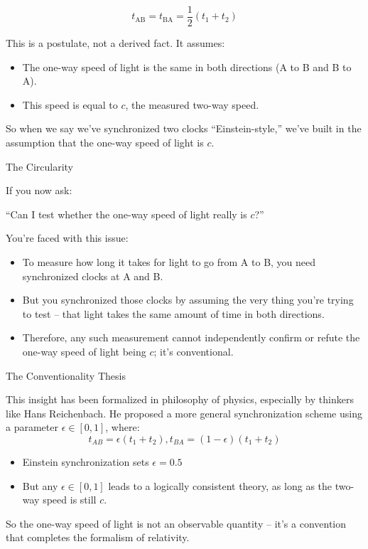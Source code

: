 \documentclass[a4paper]{article}
\theoremstyle{plain}
\theoremstyle{definition}
\begin{document}
\begin{equation}
t_{\text{AB}} = t_{\text{BA}} = \frac{1}{2}(t_1 + t_2)
\end{equation}

This is a postulate, not a derived fact.  It assumes:
\begin{itemize}
\item The one-way speed of light is the same in both directions (A to
  B and B to A).
\item This speed is equal to $c$, the measured two-way speed.
\end{itemize}

So when we say we've synchronized two clocks ``Einstein-style,'' we've
built in the assumption that the one-way speed of light is $c$.

The Circularity

If you now ask:

``Can I test whether the one-way speed of light really is $c$?''

You're faced with this issue:
\begin{itemize}
\item To measure how long it takes for light to go from A to B, you
  need synchronized clocks at A and B.
\item But you synchronized those clocks by assuming the very thing
  you're trying to test -- that light takes the same amount of time in
  both directions.
\item Therefore, any such measurement cannot independently confirm or
  refute the one-way speed of light being $c$; it's conventional.
\end{itemize}

The Conventionality Thesis

This insight has been formalized in philosophy of physics, especially
by thinkers like Hans Reichenbach. He proposed a more general
synchronization scheme using a parameter $\epsilon \in [0,1]$, where:
\begin{equation}
t_{AB} = \epsilon(t_1 + t_2), t_{BA} = (1-\epsilon)(t_1 + t_2)
\end{equation}
\begin{itemize}
\item Einstein synchronization sets $\epsilon = 0.5$
\item But any $\epsilon \in [0,1]$ leads to a logically consistent
  theory, as long as the two-way speed is still $c$.
\end{itemize}
So the one-way speed of light is not an observable quantity -- it's a
convention that completes the formalism of relativity.
\end{document}
